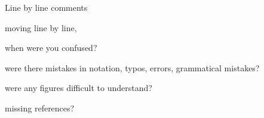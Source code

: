 \documentclass[presentation,xcolor={usenames,dvipsnames}]{beamer}
\begin{document}
\begin{frame}{Line by line comments}

moving line by line,
\bit
\item when were you confused?
\item were there mistakes in notation, typos, errors, grammatical mistakes?
\item were any figures difficult to understand?
\item missing references?
\eit

\end{frame}

%
%
%
%
%
%
\end{document}
